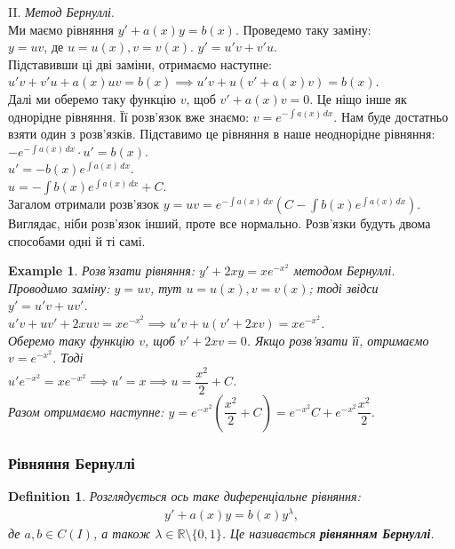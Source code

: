 \documentclass[a4paper, 10pt]{article}
\theoremstyle{theoremdd}
\theoremstyle{theoremdd}
\newtheorem{definition}[theorem]{Definition}
\theoremstyle{theoremdd}
\theoremstyle{theoremdd}
\newtheorem{example}[theorem]{Example}
\theoremstyle{theoremdd}
\theoremstyle{theoremdd}
\theoremstyle{theoremdd}
\theoremstyle{theoremdd}
\begin{document}
	II. \textit{Метод Бернуллі}.\\
	Ми маємо рівняння $y' + a(x)y = b(x)$. Проведемо таку заміну: \\
	$y = uv$, де $u=u(x), v=v(x)$.
	$y' = u'v+v'u$.\\
	Підставивши ці дві заміни, отримаємо наступне:\\
	$u'v + v'u + a(x)uv = b(x) \implies u'v + u(v'+a(x)v)=b(x)$.\\
	Далі ми оберемо таку функцію $v$, щоб $v'+a(x)v = 0$. Це ніщо інше як однорідне рівняння. Її розв'язок вже знаємо: $v = \displaystyle e^{-\int a(x)\,dx}$. Нам буде достатньо взяти один з розв'язків. Підставимо це рівняння в наше неоднорідне рівняння:\\
	$-e^{-\int a(x)\,dx} \cdot u' = b(x)$.\\
	$u' = -b(x) e^{\int a(x)\,dx}$.\\
	$u = - \int b(x) e^{\int a(x)\,dx} + C$.\\
	Загалом отримали розв'язок $y = uv = e^{-\int a(x)\,dx} \left( C - \int b(x) e^{\int a(x)\,dx} \right)$.\\
	Виглядає, ніби розв'язок інший, проте все нормально. Розв'язки будуть двома способами одні й ті самі.
	
	\begin{example}
	Розв'язати рівняння: $\displaystyle y' + 2xy = xe^{-x^2}$ методом Бернуллі.\\
	Проводимо заміну: $y = uv$, тут $u = u(x), v = v(x)$; тоді звідси $y' = u'v + uv'$.\\
	$u'v + uv' + 2xuv = xe^{-x^2} \implies u'v + u(v' + 2xv) = xe^{-x^2}$.\\
	Оберемо таку функцію $v$, щоб $v' + 2xv = 0$. Якщо розв'язати її, отримаємо $v = e^{-x^2}$. Тоді\\
	$u' e^{-x^2} = xe^{-x^2} \implies u' = x \implies u = \dfrac{x^2}{2} + C$.\\
	Разом отримаємо наступне: $y = e^{-x^2} \left( \dfrac{x^2}{2} + C \right) = e^{-x^2} C + e^{-x^2}\dfrac{x^2}{2}$.
	\end{example}
	
	\subsubsection{Рівняння Бернуллі}
	\begin{definition}
	Розглядується ось таке диференціальне рівняння:
	\begin{align*}
	y' + a(x)y = b(x)y^{\lambda},
	\end{align*}
	де $a,b \in C(I)$, а також $\lambda \in \mathbb{R} \setminus \{0,1\}$. Це називається \textbf{рівнянням Бернуллі}.
	\end{definition}
	
\end{document}

